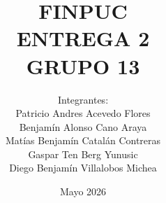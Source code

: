 \documentclass[pdftex,spanish]{pucthesis}	%
\begin{document}

\title[FINPUC \\ ENTREGA 2 \\ GRUPO 13]
   {\bf FINPUC \\ ENTREGA 2 \\ GRUPO 13}       
\author[Integrantes:]{Integrantes:\\
\textnormal{\small{
Patricio Andres Acevedo Flores\\
Benjamín Alonso Cano Araya\\
Matías Benjamín Catalán Contreras\\
Gaspar Ten Berg Yunusic\\
Diego Benjamín Villalobos Michea}
}
}

\address{Escuela de Ingenier\'ia\\
                   Pontificia Universidad Cat\'olica de Chile\\ 
                   Vicu\~na Mackenna 4860\\
                  Santiago, Chile\\
                  {\it Tel.\/} : 56 (2) 354-2000}


\date                                 {Mayo 2026}


\NoChapterPageNumber
{}
\maketitle


\tableofcontents
{} \label{listoffigures}
\listoffigures
{} \label{listoftables}
\listoftables
\cleardoublepage
\end{document}
